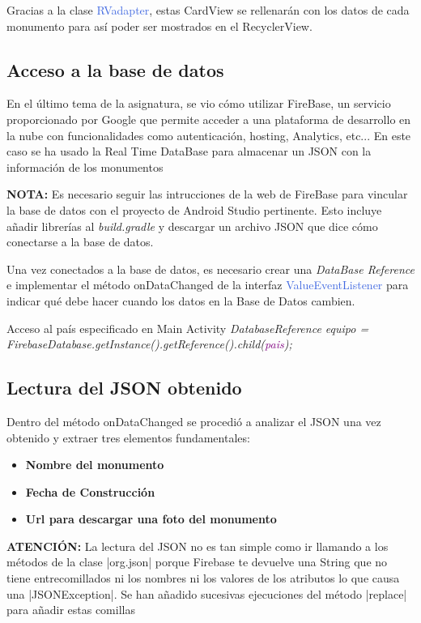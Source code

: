 \documentclass[letterpaper,twocolumn,openany,nodeprecatedcode,dvipsnames,nomultitoc]{dndbook}
\begin{document}
\begin{justify}
Gracias a la clase \textcolor{RoyalBlue}{RVadapter}, estas CardView se rellenarán con los datos de cada monumento para así poder ser mostrados en el RecyclerView.

\subsection{Acceso a la base de datos}
En el último tema de la asignatura, se vio cómo utilizar FireBase, un servicio proporcionado por Google que permite acceder a una plataforma de desarrollo en la nube con funcionalidades como autenticación, hosting, Analytics, etc... En este caso se ha usado la Real Time DataBase para almacenar un JSON con la información de los monumentos
\begin{DndReadAloud}
  \textbf{NOTA: } Es necesario seguir las intrucciones de la web de FireBase para vincular la base de datos con el proyecto de Android Studio pertinente. Esto incluye añadir librerías al \textit{build.gradle} y descargar un archivo JSON que dice cómo conectarse a la base de datos.
\end{DndReadAloud}
Una vez conectados a la base de datos, es necesario crear una \textit{DataBase Reference} e implementar el método \textcolor{BurntOrange}{onDataChanged} de la interfaz \textcolor{RoyalBlue}{ValueEventListener} para indicar qué debe hacer cuando los datos en la Base de Datos cambien.
\begingroup
\DndSetThemeColor[PhbMauve]
\begin{DndSidebar}{Acceso al país especificado en Main Activity}
  \textit{DatabaseReference equipo = FirebaseDatabase.getInstance().getReference().child(\textcolor{purple}{pais});}
\end{DndSidebar}
\endgroup
\subsection{Lectura del JSON obtenido}
Dentro del método \textcolor{BurntOrange}{onDataChanged} se procedió a analizar el JSON una vez obtenido y extraer tres elementos fundamentales:
\begin{itemize}
    \item \textbf{Nombre del monumento}
    \item \textbf{Fecha de Construcción}
    \item \textbf{Url para descargar una foto del monumento}
\end{itemize}

\begin{DndReadAloud}
  \textbf{ATENCIÓN: } La lectura del JSON no es tan simple como ir llamando a los métodos de la clase |org.json| porque Firebase te devuelve una String que no tiene entrecomillados ni los nombres ni los valores de los atributos lo que causa una |JSONException|. Se han añadido sucesivas ejecuciones del método |replace| para añadir estas comillas
\end{DndReadAloud}


\end{justify}
\end{document}
